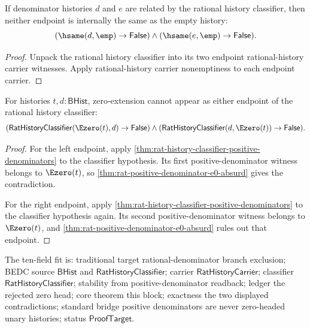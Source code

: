 \begin{theorem}
\label{thm:rat-history-classifier-endpoints-not-empty}
If denominator histories $d$ and $e$ are related by the rational history
classifier, then neither endpoint is internally the same as the empty history:
$$
(\hsame(d,\emp)\to\mathsf{False})\land
(\hsame(e,\emp)\to\mathsf{False}).
$$
\end{theorem}
\begin{proof}
Unpack the rational history classifier into its two endpoint rational-history
carrier witnesses. Apply rational-history carrier nonemptiness to each endpoint
carrier.
\end{proof}

\begin{theorem}
\label{thm:rat-history-classifier-zero-extension-endpoint-exclusion}
For histories $t,d:\mathsf{BHist}$, zero-extension cannot appear as either
endpoint of the rational history classifier:
$$
(\mathsf{RatHistoryClassifier}(\Ezero(t),d)\to\mathsf{False})\land
(\mathsf{RatHistoryClassifier}(d,\Ezero(t))\to\mathsf{False}).
$$
\end{theorem}
\begin{proof}
For the left endpoint, apply
\autoref{thm:rat-history-classifier-positive-denominators} to the classifier
hypothesis. Its first positive-denominator witness belongs to $\Ezero(t)$, so
\autoref{thm:rat-positive-denominator-e0-absurd} gives the contradiction.

For the right endpoint, apply
\autoref{thm:rat-history-classifier-positive-denominators} to the classifier
hypothesis again. Its second positive-denominator witness belongs to
$\Ezero(t)$, and
\autoref{thm:rat-positive-denominator-e0-absurd} rules out that endpoint.
\end{proof}

The ten-field fit is: traditional target rational-denominator branch
exclusion; BEDC source $\mathsf{BHist}$ and
$\mathsf{RatHistoryClassifier}$; carrier $\mathsf{RatHistoryCarrier}$;
classifier $\mathsf{RatHistoryClassifier}$; stability from
positive-denominator readback; ledger the rejected zero head; core theorem
this block; exactness the two displayed contradictions; standard bridge
positive denominators are never zero-headed unary histories; status
$\mathsf{ProofTarget}$.

